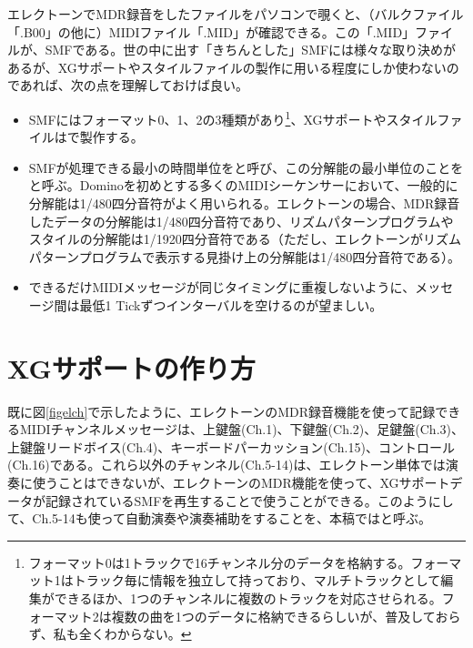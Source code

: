 \documentclass[uplatex, 10pt, dvipdfmx]{jsarticle}
\numberwithin{equation}{section}
\newcommand{\emphj}[1]{\textbf{\textrm{\textgt{{#1}}}}}
\begin{document}
エレクトーンでMDR録音をしたファイルをパソコンで覗くと、（バルクファイル「.B00」の他に）MIDIファイル「.MID」が確認できる。この「.MID」ファイルが、SMFである。世の中に出す「きちんとした」SMFには様々な取り決めがあるが、XGサポートやスタイルファイルの製作に用いる程度にしか使わないのであれば、次の点を理解しておけば良い。
\begin{itemize}
\item SMFにはフォーマット0、1、2の3種類があり\footnote{フォーマット0は1トラックで16チャンネル分のデータを格納する。フォーマット1はトラック毎に情報を独立して持っており、マルチトラックとして編集ができるほか、1つのチャンネルに複数のトラックを対応させられる。フォーマット2は複数の曲を1つのデータに格納できるらしいが、普及しておらず、私も全くわからない。}、XGサポートやスタイルファイルは\emphj{フォーマット0}で製作する。
\item SMFが処理できる最小の時間単位を\emphj{分解能}と呼び、この分解能の最小単位のことを\emphj{Tick}と呼ぶ。Dominoを初めとする多くのMIDIシーケンサーにおいて、一般的に分解能は1/480四分音符がよく用いられる。エレクトーンの場合、MDR録音したデータの分解能は1/480四分音符であり、リズムパターンプログラムやスタイルの分解能は1/1920四分音符である（ただし、エレクトーンがリズムパターンプログラムで表示する見掛け上の分解能は1/480四分音符である）\footnotemark 。
\item できるだけMIDIメッセージが同じタイミングに重複しないように、メッセージ間は最低1 Tickずつインターバルを空けるのが望ましい。
\end{itemize}

\clearpage

\section{XGサポートの作り方}
既に図\ref{figelch}で示したように、エレクトーンのMDR録音機能を使って記録できるMIDIチャンネルメッセージは、上鍵盤(Ch.1)、下鍵盤(Ch.2)、足鍵盤(Ch.3)、上鍵盤リードボイス(Ch.4)、キーボードパーカッション(Ch.15)、コントロール(Ch.16)である。これら以外のチャンネル(Ch.5-14)は、エレクトーン単体では演奏に使うことはできないが、エレクトーンのMDR機能を使って、XGサポートデータが記録されているSMFを再生することで使うことができる。このようにして、Ch.5-14も使って自動演奏や演奏補助をすることを、本稿では\emphj{XGサポート}と呼ぶ。
\end{document}
